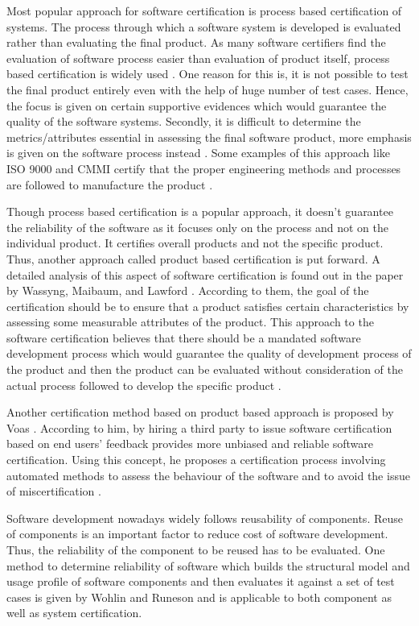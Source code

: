 \documentclass[11pt,letterpaper]{report}
\begin{document}
Most popular approach for software certification is process based certification of systems. The process through which a software system is developed is evaluated rather than evaluating the final product. As many software certifiers find the evaluation of software process easier than evaluation of product itself, process based certification is widely used \cite{Lawford}. One reason for this is, it is not possible to test the final product entirely even with the help of huge number of test cases. Hence, the focus is given on certain supportive evidences which would guarantee the quality of the software systems. Secondly, it is difficult to determine the metrics/attributes essential in assessing the final software product, more emphasis is given on the software process instead \cite{Lawford}. Some examples of this approach like ISO 9000 and CMMI certify that the proper engineering methods and processes are followed to manufacture the product \cite{Voas}.

Though process based certification is a popular approach, it doesn't guarantee the reliability of the software as it focuses only on the process and not on the individual product. It certifies overall products and not the specific product. Thus, another approach called product based certification is put forward. A detailed analysis of this aspect of software certification is found out in the paper by Wassyng, Maibaum, and Lawford \cite{Lawford}. According to them, the goal of the certification should be to ensure that a product satisfies certain characteristics by assessing some measurable attributes of the product. This approach to the software certification believes that there should be a mandated software development process which would guarantee the quality of development process of the product and then the product can be evaluated without consideration of the actual process followed to develop the specific product \cite{Lawford}.

Another certification method based on product based approach is proposed by Voas \cite{Voas}. According to him, by hiring a third party to issue software certification based on end users' feedback provides more unbiased and reliable software certification. Using this concept, he proposes a certification process involving automated methods to assess the behaviour of the software and to avoid the issue of miscertification \cite{Voas}. 

Software development nowadays widely follows reusability of components. Reuse of components is an important factor to reduce cost of software development. Thus, the reliability of the component to be reused has to be evaluated. One method to determine reliability of software which builds the structural model and usage profile of software components and then evaluates it against a set of test cases is given by Wohlin and Runeson \cite{CSC} and is applicable to both component as well as system certification. 
\end{document}
